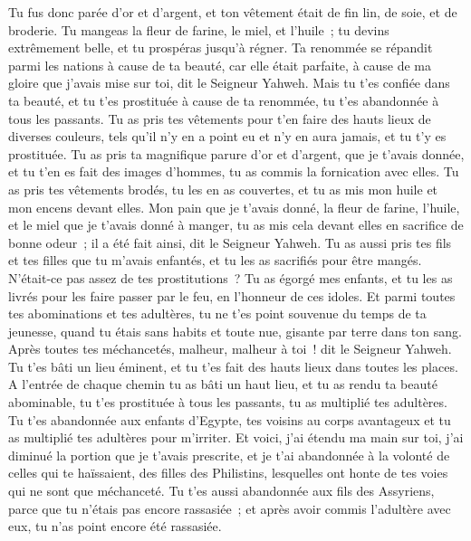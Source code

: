 \begin{multicols}{2}
Tu fus donc parée d'or et d'argent, et ton vêtement était de fin lin, de soie, et de broderie. Tu mangeas la fleur de farine, le miel, et l'huile~; tu devins extrêmement belle, et tu prospéras jusqu'à régner.
Ta renommée se répandit parmi les nations à cause de ta beauté, car elle était parfaite, à cause de ma gloire que j'avais mise sur toi, dit le Seigneur Yahweh.
Mais tu t'es confiée dans ta beauté, et tu t'es prostituée à cause de ta renommée, tu t'es abandonnée à tous les passants.
Tu as pris tes vêtements pour t'en faire des hauts lieux de diverses couleurs, tels qu'il n'y en a point eu et n'y en aura jamais, et tu t'y es prostituée.
Tu as pris ta magnifique parure d'or et d'argent, que je t'avais donnée, et tu t'en es fait des images d'hommes, tu as commis la fornication avec elles.
Tu as pris tes vêtements brodés, tu les en as couvertes, et tu as mis mon huile et mon encens devant elles.
Mon pain que je t'avais donné, la fleur de farine, l'huile, et le miel que je t'avais donné à manger, tu as mis cela devant elles en sacrifice de bonne odeur~; il a été fait ainsi, dit le Seigneur Yahweh.
Tu as aussi pris tes fils et tes filles que tu m'avais enfantés, et tu les as sacrifiés pour être mangés. N'était-ce pas assez de tes prostitutions~?
Tu as égorgé mes enfants, et tu les as livrés pour les faire passer par le feu, en l'honneur de ces idoles.
Et parmi toutes tes abominations et tes adultères, tu ne t'es point souvenue du temps de ta jeunesse, quand tu étais sans habits et toute nue, gisante par terre dans ton sang.
Après toutes tes méchancetés, malheur, malheur à toi~! dit le Seigneur Yahweh.
Tu t'es bâti un lieu éminent, et tu t'es fait des hauts lieux dans toutes les places.
A l'entrée de chaque chemin tu as bâti un haut lieu, et tu as rendu ta beauté abominable, tu t'es prostituée à tous les passants, tu as multiplié tes adultères.
Tu t'es abandonnée aux enfants d'Egypte, tes voisins au corps avantageux et tu as multiplié tes adultères pour m'irriter.
Et voici, j'ai étendu ma main sur toi, j'ai diminué la portion que je t'avais prescrite, et je t'ai abandonnée à la volonté de celles qui te haïssaient, des filles des Philistins, lesquelles ont honte de tes voies qui ne sont que méchanceté.
Tu t'es aussi abandonnée aux fils des Assyriens, parce que tu n'étais pas encore rassasiée~; et après avoir commis l'adultère avec eux, tu n'as point encore été rassasiée.

\end{multicols}

